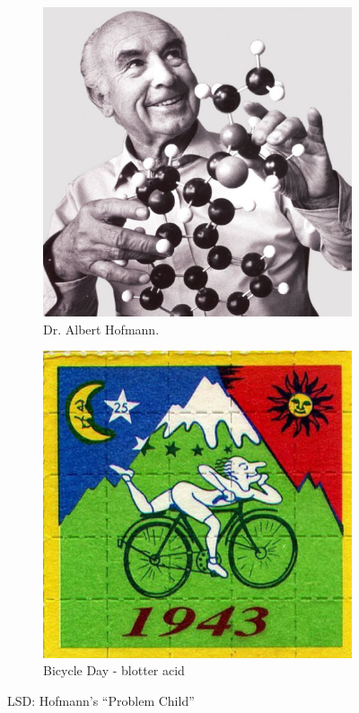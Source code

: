 \documentclass{UIdahoMastersThesis}
\begin{document}
\begin{figure}%
  \centering
  \begin{subfigure}[b]{0.4\linewidth}
    \includegraphics[width=\linewidth]{hofmann_sq.jpg}
    \caption{Dr. Albert Hofmann.}
  \end{subfigure}
  \begin{subfigure}[b]{0.4\linewidth}
    \includegraphics[width=\linewidth]{bicycle_day.jpg}
    \caption{Bicycle Day - blotter acid}
  \end{subfigure}
  \caption{LSD: Hofmann's \enquote{Problem Child}}
  \label{fig:hofmann}
\end{figure}
\end{document}
